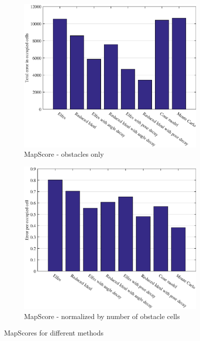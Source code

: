 \begin{figure}
	\label{fig:score_comparison}
	\begin{subfigure}[b]{0.45\textwidth}
		\centering
		\includegraphics[scale=1]{figures/static_mapping/comparison_obstacle_error}
		\caption{MapScore - obstacles only}
		\label{fig:comparison_obstacle_error}
	\end{subfigure}
	\begin{subfigure}[b]{0.45\textwidth}
		\centering
		\includegraphics[scale=1]{figures/static_mapping/comparison_obstacle_error_per_cell}
		\caption{MapScore - normalized by number of obstacle cells}
		\label{fig:comparison_obstacle_error_per_cell}
	\end{subfigure}
	\caption{MapScores for different methods}
\end{figure}